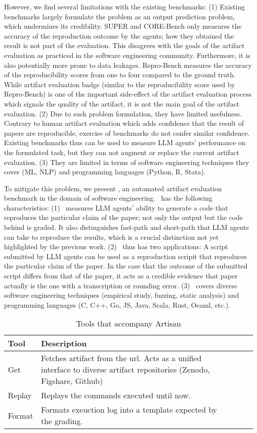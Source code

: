 However, we find several limitations with the existing benchmarks:
(1) Existing benchmarks largely formulate the problem as an output prediction problem, which undermines its credibility.
SUPER and CORE-Bench only measures the accuracy of the reproduction outcome by the agents; how they obtained the result is not part of the evaluation.
This disagrees with the goals of the artifact evaluation as practiced in the software engineering community.
Furthermore, it is also potentially more prone to data leakages.
Repro-Bench measures the accuracy of the reproducibility scores from one to four compared to the ground truth.
While artifact evaluation badge (similar to the reproducibility score used by Repro-Bench) is one of the important side-effect of the artifact evaluation process which signals the quality of the artifact, it is not the main goal of the artifact evaluation.
(2) Due to such problem formulation, they have limited usefulness.
Contrary to human artifact evaluation which adds confidence that the result of papers are reproducible, exercise of benchmarks do not confer similar confidence.
Existing benchmarks thus can be used to measure LLM agents' performance on the formulated task, but they can not augment or replace the current artifact evaluation.
(3) They are limited in terms of software engineering techniques they cover (ML, NLP) and programming languages (Python, R, Stata).

To mitigate this problem, we present \benchmark, an automated artifact evaluation benchmark in the domain of software engineering.
\benchmark~has the following characteristics:
(1) \benchmark~measures LLM agents' ability to generate a code that reproduces the particular claim of the paper; not only the output but the code behind is graded.
It also distinguishes fast-path and short-path that LLM agents can take to reproduce the results, which is a crucial distinction not yet highlighted by the previous work.
(2) \benchmark~thus has two applications:
A script submitted by LLM agents can be used as a reproduction scripit that reproduces the particular claim of the paper.
In the case that the outcome of the submitted script differs from that of the paper, it acts as a credible evidence that paper actually is the one with a transcription or rounding error.
(3) \benchmark~covers diverse software engineering techniques (empirical study, fuzzing, static analysis) and programming languages (C, C++, Go, JS, Java, Scala, Rust, Ocaml, etc.).

\begin{table}[t]
\caption{Tools that accompany Artisan}
\label{t:artisan_tools}
\centering
\renewcommand{\arraystretch}{1.25}
\begin{tabularx}{\linewidth}{lXXXX}
\toprule
Tool  & Description \\
\midrule
Get  & Fetches artifact from the url. Acts as a unified interface to diverse artifact repositories (Zenodo, Figshare, Github) \\
Replay & Replays the commands executed until now. \\
Format & Formats exeuction log into a template expected by the grading. \\
\bottomrule
\end{tabularx}
\end{table}

